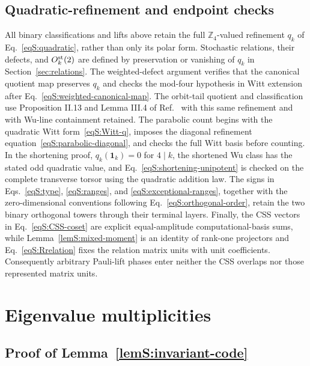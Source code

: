 \documentclass[journal,twocolumn]{IEEEtran}
\theoremstyle{definition}
\theoremstyle{plain}
\newcommand{\one}{\bm 1}
\begin{document}
\subsection{Quadratic-refinement and endpoint checks}
\label{app:quadratic-checks}
All binary classifications and lifts above retain the full
$\mathbb Z_4$-valued refinement $q_k$ of Eq.~\eqref{eqS:quadratic}, rather
than only its polar form.  Stochastic relations, their defects, and
$O_k^{\rm st}(2)$ are defined by preservation or vanishing of $q_k$ in
Section~\ref{sec:relations}.  The weighted-defect argument verifies that the canonical quotient
map preserves $q_k$ and checks the mod-four hypothesis in Witt extension
after Eq.~\eqref{eqS:weighted-canonical-map}.  The orbit-tail quotient and
classification use Proposition II.13 and Lemma III.4 of
Ref.~\cite{MontealegreGross2025} with this same refinement and with Wu-line
containment retained.  The parabolic count begins
with the quadratic Witt form~\eqref{eqS:Witt-q}, imposes the diagonal
refinement equation~\eqref{eqS:parabolic-diagonal}, and checks the full Witt
basis before counting.  In the shortening proof,
$q_k(\one_k)=0$ for $4\mid k$, the shortened Wu class has the stated odd
quadratic value, and Eq.~\eqref{eqS:shortening-unipotent} is checked on the
complete transverse torsor using the quadratic addition law.  The signs in
Eqs.~\eqref{eqS:type}, \eqref{eqS:ranges}, and
\eqref{eqS:exceptional-ranges}, together with the zero-dimensional
conventions following Eq.~\eqref{eqS:orthogonal-order}, retain the two binary
orthogonal towers through their terminal layers.  Finally, the CSS vectors
in Eq.~\eqref{eqS:CSS-coset} are explicit equal-amplitude
computational-basis sums, while Lemma~\ref{lemS:mixed-moment} is an identity
of rank-one projectors and Eq.~\eqref{eqS:Rrelation} fixes the relation
matrix units with unit coefficients.  Consequently arbitrary Pauli-lift
phases enter neither the CSS overlaps nor those represented matrix units.

\section{Eigenvalue multiplicities}
\label{app:multiplicity}

\subsection{Proof of Lemma~\ref{lemS:invariant-code}}
\label{app:proof-invariant-code}
\end{document}
